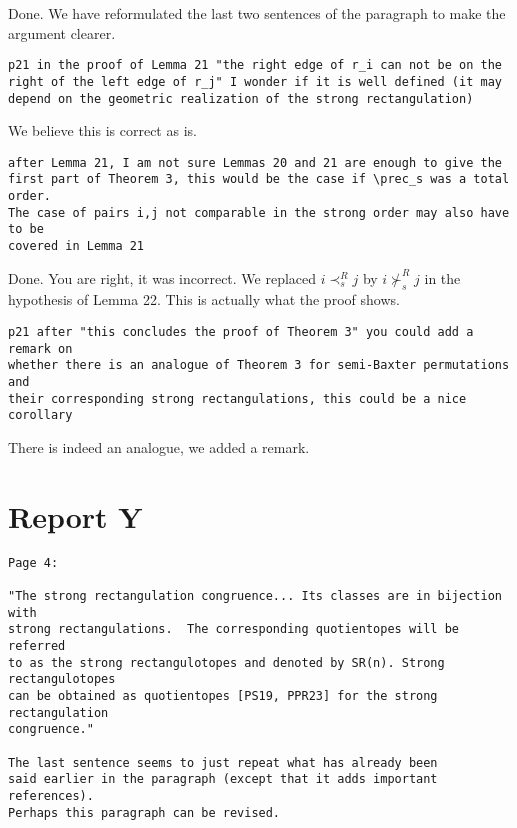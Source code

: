 \documentclass{article}
\begin{document}
Done. We have reformulated the last two sentences of the paragraph to make the argument clearer.

\begin{verbatim}
p21 in the proof of Lemma 21 "the right edge of r_i can not be on the 
right of the left edge of r_j" I wonder if it is well defined (it may 
depend on the geometric realization of the strong rectangulation)
\end{verbatim}

We believe this is correct as is.

\begin{verbatim}
after Lemma 21, I am not sure Lemmas 20 and 21 are enough to give the 
first part of Theorem 3, this would be the case if \prec_s was a total order. 
The case of pairs i,j not comparable in the strong order may also have to be 
covered in Lemma 21
\end{verbatim}

Done. You are right, it was incorrect. We replaced $i \prec_s^R j$ by $i \not\succ_s^R j$ in the hypothesis of Lemma 22. This is actually what the proof shows.

\begin{verbatim}
p21 after "this concludes the proof of Theorem 3" you could add a remark on 
whether there is an analogue of Theorem 3 for semi-Baxter permutations and 
their corresponding strong rectangulations, this could be a nice corollary
\end{verbatim}

There is indeed an analogue, we added a remark.

\section{Report Y}

\begin{verbatim}
Page 4:

"The strong rectangulation congruence... Its classes are in bijection with 
strong rectangulations.  The corresponding quotientopes will be referred 
to as the strong rectangulotopes and denoted by SR(n). Strong rectangulotopes 
can be obtained as quotientopes [PS19, PPR23] for the strong rectangulation 
congruence." 

The last sentence seems to just repeat what has already been 
said earlier in the paragraph (except that it adds important references).  
Perhaps this paragraph can be revised.
\end{verbatim}
\end{document}
